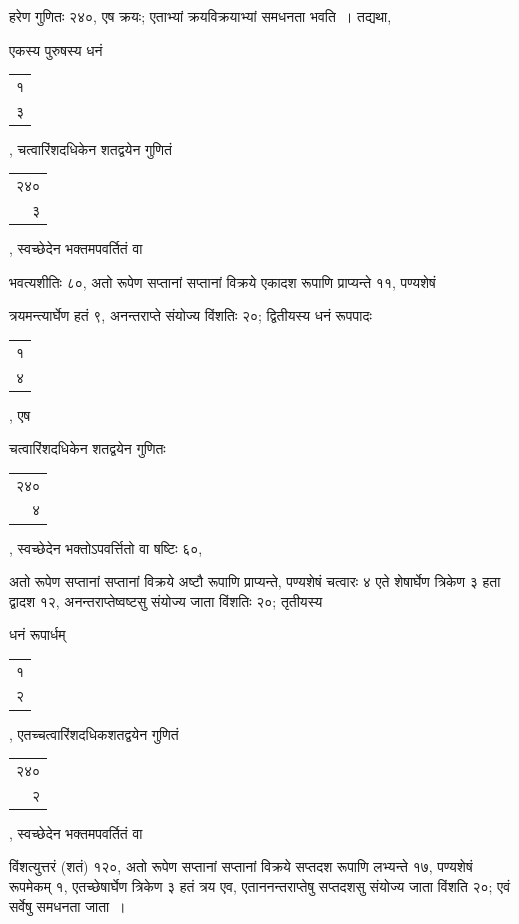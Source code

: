 \documentclass[10pt, openany]{book}
\begin{document}
{{
{हरेण गुणितः २४०, एष क्रयः; एताभ्यां क्रयविक्रयाभ्यां समधनता भवति~।
तद्यथा,}
{एकस्य पुरुषस्य धनं\begin{tabular}{r}१\\३\end{tabular}, चत्वारिंशदधिकेन शतद्वयेन गुणितं\begin{tabular}{r}२४०\\ ३\end{tabular},
स्वच्छेदेन भक्तमपवर्तितं वा}
{भवत्यशीतिः ८०, अतो रूपेण सप्तानां सप्तानां विक्रये एकादश रूपाणि
प्राप्यन्ते ११, पण्यशेषं}
{त्रयमन्त्यार्घेण हतं ९, अनन्तराप्ते संयोज्य विंशतिः २०; द्वितीयस्य धनं
रूपपादः\begin{tabular}{r}१\\४ \end{tabular}, एष}
{चत्वारिंशदधिकेन शतद्वयेन गुणितः\begin{tabular}{r}२४०\\ ४\end{tabular}, स्वच्छेदेन भक्तोऽपवर्त्तितो वा
षष्टिः ६०,}
{अतो रूपेण सप्तानां सप्तानां विक्रये अष्टौ रूपाणि प्राप्यन्ते, पण्यशेषं
चत्वारः ४ एते}
{शेषार्घेण त्रिकेण ३ हता द्वादश १२, अनन्तराप्तेष्वष्टसु संयोज्य जाता
विंशतिः २०; तृतीयस्य}
{धनं रूपार्धम्\begin{tabular}{r}१\\ २\end{tabular}, एतच्चत्वारिंशदधिकशतद्वयेन गुणितं\begin{tabular}{r}२४०\\ २\end{tabular}, स्वच्छेदेन
भक्तमपवर्तितं वा}
{विंशत्युत्तरं (शतं) १२०, अतो रूपेण सप्तानां सप्तानां विक्रये सप्तदश
रूपाणि लभ्यन्ते १७,}
{पण्यशेषं रूपमेकम् १, एतच्छेषार्घेण त्रिकेण ३ हतं त्रय एव,
एताननन्तराप्तेषु सप्तदशसु संयोज्य}
{जाता विंशति २०; एवं सर्वेषु समधनता जाता~।}
\vspace{3mm}

}}
\end{document}
